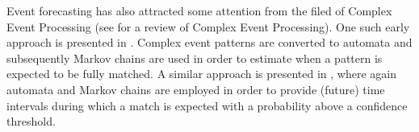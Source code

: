 \par Event forecasting has also attracted some attention from the filed of Complex Event Processing (see \cite{Cugola:2012:PFI:2187671.2187677} for a review of Complex Event Processing).
One such early approach is presented in \cite{muthusamy_predictive_2010}.
Complex event patterns are converted to automata and subsequently
Markov chains are used in order to estimate when a pattern is expected to be fully matched.
A similar approach is presented in \cite{alevizos2017event},
where again automata and Markov chains are employed in order to provide (future) time intervals during which a match is expected with a probability above a confidence threshold. 